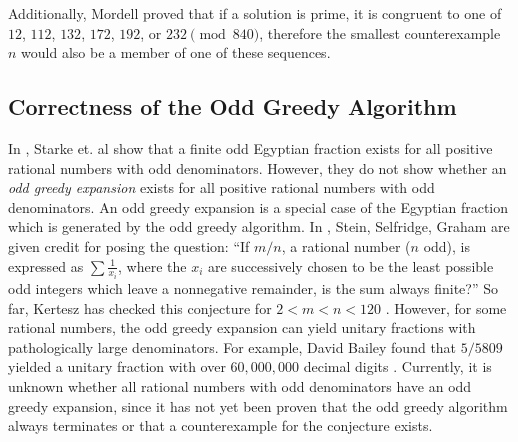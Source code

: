 \documentclass[paper=a4, fontsize=11pt]{scrartcl}
\numberwithin{equation}{section}	 %
\numberwithin{figure}{section}	 %
\numberwithin{table}{section}	 %
\begin{document}
Additionally, Mordell proved that if a solution is prime, it is congruent to one of $12$, $112$, $132$, $172$, $192$, or $232 \pmod{840}$\:\cite{mordell}, therefore the smallest counterexample $n$ would also be a member of one of these sequences.
\subsection{Correctness of the Odd Greedy Algorithm}\label{sec:oddgreedy}
In \cite{starke}, Starke et. al show that a finite odd Egyptian fraction exists for all positive rational numbers with odd denominators. However, they do not show whether an \textit{odd greedy expansion} exists for all positive rational numbers with odd denominators. An odd greedy expansion is a special case of the Egyptian fraction which is generated by the odd greedy algorithm. In \cite{guy}, Stein, Selfridge, Graham are given credit for posing the question: “If $m/n$, a rational number ($n$ odd), is expressed as $\sum \frac{1}{x_i}$, where the $x_i$ are successively chosen to be the least possible odd integers which leave a nonnegative remainder, is the sum always finite?” So far, Kertesz has checked this conjecture for $2 < m < n < 120$ \cite{guy}. However, for some rational numbers, the odd greedy expansion can yield unitary fractions with pathologically large denominators. For example, David Bailey found that $5/5809$ yielded a unitary fraction with over $60,000,000$ decimal digits \cite{guy}. Currently, it is unknown whether all rational numbers with odd denominators have an odd greedy expansion, since it has not yet been proven that the odd greedy algorithm always terminates or that a counterexample for the conjecture exists.
\end{document}
